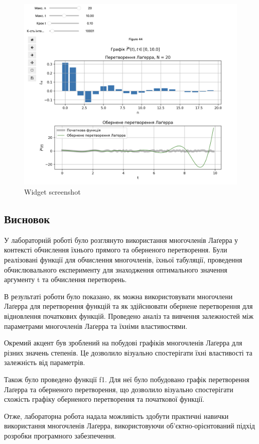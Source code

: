 \documentclass[11pt]{article}
\begin{document}
    \begin{figure}
\centering
\includegraphics{screenshots/classes_7.png}
\caption{Widget screenshot}
\end{figure}

    \subsection*{Висновок}\label{ux432ux438ux441ux43dux43eux432ux43eux43a}

У лабораторній роботі було розглянуто використання многочленів Лаґерра у
контексті обчислення їхнього прямого та оберненого перетворення. Були
реалізовані функції для обчислення многочленів, їхньої табуляції,
проведення обчислювального експерименту для знаходження оптимального
значення аргументу t та обчислення перетворень.

В результаті роботи було показано, як можна використовувати многочлени
Лаґерра для перетворення функцій та як здійснювати обернене перетворення
для відновлення початкових функцій. Проведено аналіз та вивчення
залежностей між параметрами многочленів Лаґерра та їхніми властивостями.

Окремий акцент був зроблений на побудові графіків многочленів Лаґерра
для різних значень степенів. Це дозволило візуально спостерігати їхні
властивості та залежність від параметрів.

Також було проведено функції f1. Для неї було побудовано
графік перетворення Лаґерра та оберненого перетворення, що дозволило
візуально спостерігати схожість графіку оберненого перетворення та
початкової функції.

Отже, лабораторна робота надала можливість здобути практичні навички
використання многочленів Лаґерра, використовуючи об'єктно-орієнтований
підхід розробки програмного забезпечення.


    
    
    
\end{document}
